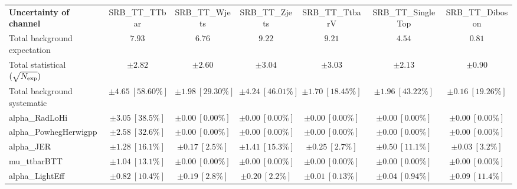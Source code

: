 
\begin{sidewaystable}
\begin{center}
\setlength{\tabcolsep}{0.0pc}
\begin{tabular*}{\textwidth}{@{\extracolsep{\fill}}lcccccc}
\noalign{\smallskip}\hline\noalign{\smallskip}
{\bf Uncertainty of channel}                                    & SRB\_TT\_TTbar            & SRB\_TT\_Wjets            & SRB\_TT\_Zjets            & SRB\_TT\_TtbarV            & SRB\_TT\_SingleTop            & SRB\_TT\_Diboson            \\
\noalign{\smallskip}\hline\noalign{\smallskip}
Total background expectation             &  $7.93$        &  $6.76$        &  $9.22$        &  $9.21$        &  $4.54$        &  $0.81$       \\
\noalign{\smallskip}\hline\noalign{\smallskip}
Total statistical $(\sqrt{N_{\rm exp}})$              & $\pm 2.82$        & $\pm 2.60$        & $\pm 3.04$        & $\pm 3.03$        & $\pm 2.13$        & $\pm 0.90$       \\
Total background systematic               & $\pm 4.65\ [58.60\%] $        & $\pm 1.98\ [29.30\%] $        & $\pm 4.24\ [46.01\%] $        & $\pm 1.70\ [18.45\%] $        & $\pm 1.96\ [43.22\%] $        & $\pm 0.16\ [19.26\%] $             \\
\noalign{\smallskip}\hline\noalign{\smallskip}
\noalign{\smallskip}\hline\noalign{\smallskip}
alpha\_RadLoHi         & $\pm 3.05\ [38.5\%] $          & $\pm 0.00\ [0.00\%] $          & $\pm 0.00\ [0.00\%] $          & $\pm 0.00\ [0.00\%] $          & $\pm 0.00\ [0.00\%] $          & $\pm 0.00\ [0.00\%] $       \\
alpha\_PowhegHerwigpp         & $\pm 2.58\ [32.6\%] $          & $\pm 0.00\ [0.00\%] $          & $\pm 0.00\ [0.00\%] $          & $\pm 0.00\ [0.00\%] $          & $\pm 0.00\ [0.00\%] $          & $\pm 0.00\ [0.00\%] $       \\
alpha\_JER         & $\pm 1.28\ [16.1\%] $          & $\pm 0.17\ [2.5\%] $          & $\pm 1.41\ [15.3\%] $          & $\pm 0.25\ [2.7\%] $          & $\pm 0.50\ [11.1\%] $          & $\pm 0.03\ [3.2\%] $       \\
mu\_ttbarBTT         & $\pm 1.04\ [13.1\%] $          & $\pm 0.00\ [0.00\%] $          & $\pm 0.00\ [0.00\%] $          & $\pm 0.00\ [0.00\%] $          & $\pm 0.00\ [0.00\%] $          & $\pm 0.00\ [0.00\%] $       \\
alpha\_LightEff         & $\pm 0.82\ [10.4\%] $          & $\pm 0.19\ [2.8\%] $          & $\pm 0.20\ [2.2\%] $          & $\pm 0.01\ [0.13\%] $          & $\pm 0.04\ [0.94\%] $          & $\pm 0.09\ [11.4\%] $       \\

\end{tabular*}
\end{center}
\end{sidewaystable}
